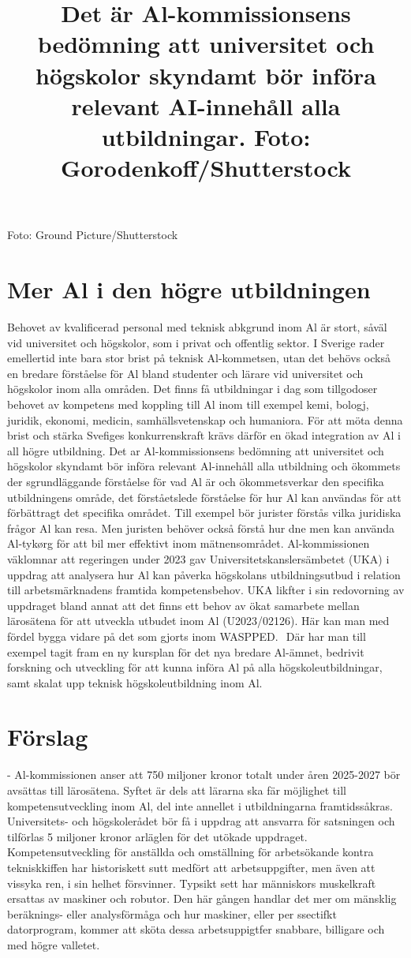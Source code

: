 {{{{{{{{{Foto: Ground Picture/Shutterstock

\title{
Det är Al-kommissionsens bedömning att universitet och högskolor skyndamt bör införa relevant AI-innehåll alla utbildningar. Foto: Gorodenkoff/Shutterstock
}
\section*{Mer Al i den högre utbildningen}
Behovet av kvalificerad personal med teknisk abkgrund inom Al är stort, såväl vid universitet och högskolor, som i privat och offentlig sektor. I Sverige rader emellertid inte bara stor brist på teknisk Al-kommetsen, utan det behövs också en bredare förståelse för Al bland studenter och lärare vid universitet och högskolor inom alla områden. Det finns få utbildningar i dag som tillgodoser behovet av kompetens med koppling till Al inom till exempel kemi, bologj, juridik, ekonomi, medicin, samhällsvetenskap och humaniora. För att möta denna brist och stärka Svefiges konkurrenskraft krävs därför en ökad integration av Al i all högre utbildning.
Det ar Al-kommissionsens bedömning att universitet och högskolor skyndamt bör införa relevant Al-innehåll alla utbildning och ökommets der sgrundläggande förståelse för vad Al är och ökommetsverkar den specifika utbildningens område, det förståetslede förståelse för hur Al kan användas för att förbättragt det specifika området. Till exempel bör jurister förstås vilka juridiska frågor Al kan resa. Men juristen behöver också förstå hur dne men kan använda Al-tykørg för att bil mer effektivt inom mätnensområdet.
Al-kommissionen väklomnar att regeringen under 2023 gav Universitetskanslersämbetet (UKA) i uppdrag att analysera hur Al kan påverka högskolans utbildningsutbud i relation till arbetsmärknadens framtida kompetensbehov. UKA likfter i sin redovorning av uppdraget bland annat att det finns ett behov av ökat samarbete mellan lärosätena för att utveckla utbudet inom Al (U2023/02126). Här kan man med fördel bygga vidare på det som gjorts inom WASPPED. \({ }^{}\) Där har man till exempel tagit fram en ny kursplan för det nya bredare Al-ämnet, bedrivit forskning och utveckling för att kunna införa Al på alla högskoleutbildningar, samt skalat upp teknisk högskoleutbildning inom Al.
\section*{Förslag}
- Al-kommissionen anser att 750 miljoner kronor totalt under åren 2025-2027 bör avsättas till lärosätena. Syftet är dels att lärarna ska fär möjlighet till kompetensutveckling inom Al, del inte annellet i utbildningarna framtidssåkras. Universitets- och högskolerådet bör få i uppdrag att ansvarra för satsningen och tilförlas 5 miljoner kronor arläglen för det utökade uppdraget.
Kompetensutveckling för anställda och omställning för arbetsökande kontra tekniskkiffen har historiskett sutt medfört att arbetsuppgifter, men även att vissyka ren, i sin helhet försvinner. Typsikt sett har människors muskelkraft ersattas av maskiner och robutor. Den här gången handlar det mer om mänsklig beräknings- eller analysförmåga och hur maskiner, eller per ssectifkt datorprogram, kommer att sköta dessa arbetsuppigtfer snabbare, billigare och med högre valletet.

}}}}}}}}}
